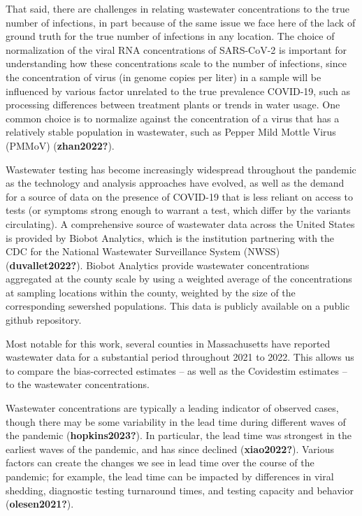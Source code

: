 \documentclass[12pt,twoside]{smiththesis}
\begin{document}
That said, there are challenges in relating wastewater concentrations to the true number of infections, in part because of the same issue we face here of the lack of ground truth for the true number of infections in any location. The choice of normalization of the viral RNA concentrations of SARS-CoV-2 is important for understanding how these concentrations scale to the number of infections, since the concentration of virus (in genome copies per liter) in a sample will be influenced by various factor unrelated to the true prevalence COVID-19, such as processing differences between treatment plants or trends in water usage. One common choice is to normalize against the concentration of a virus that has a relatively stable population in wastewater, such as Pepper Mild Mottle Virus (PMMoV) (\textbf{zhan2022?}).

Wastewater testing has become increasingly widespread throughout the pandemic as the technology and analysis approaches have evolved, as well as the demand for a source of data on the presence of COVID-19 that is less reliant on access to tests (or symptoms strong enough to warrant a test, which differ by the variants circulating). A comprehensive source of wastewater data across the United States is provided by Biobot Analytics, which is the institution partnering with the CDC for the National Wastewater Surveillance System (NWSS) (\textbf{duvallet2022?}). Biobot Analytics provide wastewater concentrations aggregated at the county scale by using a weighted average of the concentrations at sampling locations within the county, weighted by the size of the corresponding sewershed populations. This data is publicly available on a public github repository.

Most notable for this work, several counties in Massachusetts have reported wastewater data for a substantial period throughout 2021 to 2022. This allows us to compare the bias-corrected estimates -- as well as the Covidestim estimates -- to the wastewater concentrations.

Wastewater concentrations are typically a leading indicator of observed cases, though there may be some variability in the lead time during different waves of the pandemic (\textbf{hopkins2023?}). In particular, the lead time was strongest in the earliest waves of the pandemic, and has since declined (\textbf{xiao2022?}). Various factors can create the changes we see in lead time over the course of the pandemic; for example, the lead time can be impacted by differences in viral shedding, diagnostic testing turnaround times, and testing capacity and behavior (\textbf{olesen2021?}).
\end{document}
